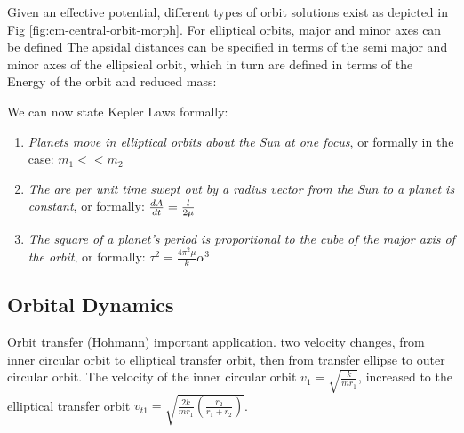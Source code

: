 Given an effective potential, different types of orbit solutions exist as depicted in Fig \ref{fig:cm-central-orbit-morph}. For elliptical orbits, major and minor axes can be defined The apsidal distances can be specified in terms of the semi major and minor axes of the ellipsical orbit, which in turn are defined in terms of the Energy of the orbit and reduced mass:


We can now state Kepler Laws formally:

\begin{enumerate}
	\item \textit{Planets move in elliptical orbits about the Sun at one focus}, or formally in the case: $m_1 << m_2$
	\item \textit{The are per unit time swept out by a radius vector from the Sun to a planet is constant}, or formally: $\ddt[A] = \frac{l}{2\mu}$
	\item \textit{The square of a planet's period is proportional to the cube of the major axis of the orbit}, or formally: $\tau^2 = \frac{4\pi^2 \mu}{k}\alpha^3$
\end{enumerate}



\subsection{Orbital Dynamics}
Orbit transfer (Hohmann) important application. two velocity changes, from inner circular orbit to elliptical transfer orbit, then from transfer ellipse to outer circular orbit. The velocity of the inner circular orbit $v_1 = \sqrt{\frac{k}{mr_1}}$, increased to the elliptical transfer orbit $v_{t1}=\sqrt{\frac{2k}{mr_1}\left(\frac{r_2}{r_1 + r_2}\right)}$.


